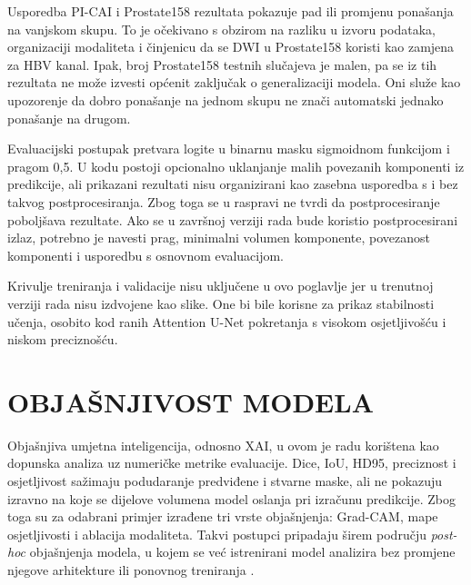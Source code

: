 \documentclass[a4paper,12pt,oneside]{article}
\let\sectionwithoutpagebreak\section
\renewcommand{\section}{\clearpage\sectionwithoutpagebreak}%
\begin{document}

Usporedba PI-CAI i Prostate158 rezultata pokazuje pad ili promjenu ponašanja na vanjskom skupu. To je očekivano s obzirom na razliku u izvoru podataka, organizaciji modaliteta i činjenicu da se DWI u Prostate158 koristi kao zamjena za HBV kanal. Ipak, broj Prostate158 testnih slučajeva je malen, pa se iz tih rezultata ne može izvesti općenit zaključak o generalizaciji modela. Oni služe kao upozorenje da dobro ponašanje na jednom skupu ne znači automatski jednako ponašanje na drugom.

Evaluacijski postupak pretvara logite u binarnu masku sigmoidnom funkcijom i pragom 0,5. U kodu postoji opcionalno uklanjanje malih povezanih komponenti iz predikcije, ali prikazani rezultati nisu organizirani kao zasebna usporedba s i bez takvog postprocesiranja. Zbog toga se u raspravi ne tvrdi da postprocesiranje poboljšava rezultate. Ako se u završnoj verziji rada bude koristio postprocesirani izlaz, potrebno je navesti prag, minimalni volumen komponente, povezanost komponenti i usporedbu s osnovnom evaluacijom.


Krivulje treniranja i validacije nisu uključene u ovo poglavlje jer u trenutnoj verziji rada nisu izdvojene kao slike. One bi bile korisne za prikaz stabilnosti učenja, osobito kod ranih Attention U-Net pokretanja s visokom osjetljivošću i niskom preciznošću.


\section{OBJAŠNJIVOST MODELA}

Objašnjiva umjetna inteligencija, odnosno XAI, u ovom je radu korištena kao dopunska analiza uz numeričke metrike evaluacije. Dice, IoU, HD95, preciznost i osjetljivost sažimaju podudaranje predviđene i stvarne maske, ali ne pokazuju izravno na koje se dijelove volumena model oslanja pri izračunu predikcije. Zbog toga su za odabrani primjer izrađene tri vrste objašnjenja: Grad-CAM, mape osjetljivosti i ablacija modaliteta. Takvi postupci pripadaju širem području \textit{post-hoc} objašnjenja modela, u kojem se već istrenirani model analizira bez promjene njegove arhitekture ili ponovnog treniranja \cite{xai_survey}.
\end{document}
